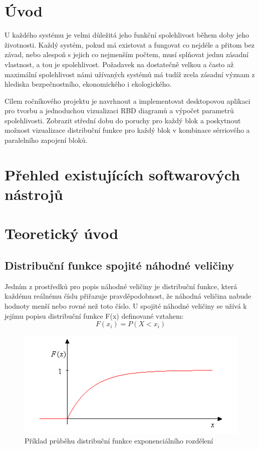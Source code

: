 \documentclass[FM,RP]{tulthesis}
\begin{document}
\chapter*{Úvod}
    U každého systému je velmi důležitá jeho funkční spolehlivost během doby jeho životnosti. Každý systém, pokud má existovat a fungovat co nejdéle a přitom bez závad,
    nebo alespoň s jejich co nejmenším počtem, musí splňovat jednu zásadní vlastnost, a tou je spolehlivost. 
    Požadavek na dostatečně velkou a často až maximální spolehlivost námi užívaných systémů má tudíž zcela zásadní význam z hlediska bezpečnostního, ekonomického i
    ekologického. 

    Cílem ročníkového projektu je navrhnout a implementovat desktopovou aplikaci pro tvorbu a jednoduchou vizualizaci RBD diagramů a výpočet parametrů spolehlivosti.
    Zobrazit střední dobu do poruchy pro každý blok a poskytnout možnost vizualizace distribuční funkce pro každý blok v kombinace sérriového a paralelního zapojení bloků.

\chapter{Přehled existujících softwarových nástrojů}

\chapter{Teoretický úvod}
        
    \section{Distribuční funkce spojité náhodné veličiny}
        Jedním z prostředků pro popis náhodné veličiny je distribuční funkce, která každému
        reálnému číslu přiřazuje pravděpodobnost, že náhodná veličina nabude hodnoty menší nebo
        rovné než toto číslo.\cite{6}
        U spojité náhodné veličiny se užívá k jejímu popisu distribuční funkce F(x) definované vztahem: 
        $$ F(x_{i}) = P(X<x_{i}) $$
            \begin{figure}[h]
                \centering
                \includegraphics[scale=0.75]{pic/distrib.png}
                \caption{Příklad průběhu distribuční funkce exponenciálního rozdělení} \label{Obrázek č. 2.1}
            \end{figure}
\end{document}
